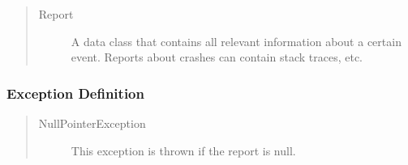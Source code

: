 \begin{quote}
	\begin{description}
		\item[Report] A data class that contains all relevant information about a
		certain event. Reports about crashes can contain stack traces, etc.
	\end{description} 
\end{quote}

\subsubsection{Exception Definition} 

\begin{quote}
	\begin{description}
		\item[NullPointerException] This exception is thrown if the report is null.
	\end{description} 
\end{quote}